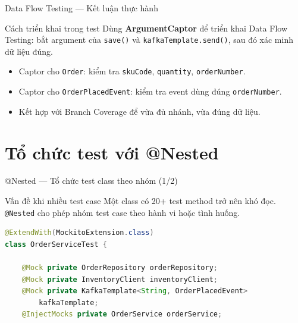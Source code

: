 \documentclass[aspectratio=169,10pt]{beamer}
\begin{document}
\begin{frame}{Data Flow Testing --- Kết luận thực hành}
  \begin{exampleblock}{Cách triển khai trong test}
    Dùng \textbf{ArgumentCaptor} để triển khai Data Flow Testing:
    bắt argument của \texttt{save()} và \texttt{kafkaTemplate.send()},
    sau đó xác minh dữ liệu đúng.
  \end{exampleblock}

  \begin{itemize}
    \item Captor cho \texttt{Order}: kiểm tra \texttt{skuCode}, \texttt{quantity}, \texttt{orderNumber}.
    \item Captor cho \texttt{OrderPlacedEvent}: kiểm tra event dùng đúng \texttt{orderNumber}.
    \item Kết hợp với Branch Coverage để vừa đủ nhánh, vừa đúng dữ liệu.
  \end{itemize}
\end{frame}

\section{Tổ chức test với @Nested}

\begin{frame}[fragile]{@Nested --- Tổ chức test class theo nhóm (1/2)}
  \begin{block}{Vấn đề khi nhiều test case}
    Một class có 20+ test method trở nên khó đọc. \texttt{@Nested}
    cho phép nhóm test case theo hành vi hoặc tình huống.
  \end{block}

\begin{lstlisting}[language=java]
@ExtendWith(MockitoExtension.class)
class OrderServiceTest {

    @Mock private OrderRepository orderRepository;
    @Mock private InventoryClient inventoryClient;
    @Mock private KafkaTemplate<String, OrderPlacedEvent>
        kafkaTemplate;
    @InjectMocks private OrderService orderService;
\end{lstlisting}
\end{frame}
\end{document}
